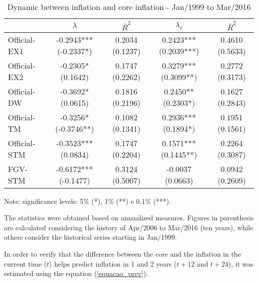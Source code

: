 \documentclass[10pt]{article}
\begin{document}
\begin{table}[h]
\centering
\caption{Dynamic between inflation and core inflation - Jan/1999 to Mar/2016}
\label{dinamica_nucleos}
\begin{threeparttable}
\begin{tabular}{@{}l|cc|cc@{}}
\toprule
             & \textbf{$\lambda$}     & \textbf{$\bar{R}^2$} & \textbf{$\lambda_c$}   & \textbf{$\bar{R}^2$} \\ \midrule
Official-EX1 & -0.2943*** (-0.2337*)  & 0.2034 (0.1237)      & 0.2423*** (0.2039***)  & 0.4610 (0.5633) \\
Official-EX2 & -0.2305*   (0.1642)    & 0.1747 (0.2262)      & 0.3279*** (0.3099**)   & 0.2772 (0.3173) \\
Official-DW  & -0.3692*   (0.0615)    & 0.1816 (0.2196)      & 0.2450**  (0.2303*)    & 0.1627 (0.2843) \\
Official-TM  & -0.3256*   (-0.3746**) & 0.1082 (0.1341)      & 0.2936*** (0.1894*)    & 0.1951 (0.1561) \\
Official-STM & -0.3523*** (0.0834)    & 0.1747 (0.2204)      & 0.1571*** (0.1445**)   & 0.2264 (0.3087) \\ 
FGV-STM      & -0.6172*** (-0.1477)   & 0.3124 (0.5007)      & -0.0037   (0.0663)     & 0.0942 (0.2609) \\ \bottomrule
\end{tabular}\begin{tablenotes}
\item \scriptsize{Note: significance levels: 5\% (*), 1\% (**) e 0.1\% (***).}
\item \scriptsize{The statistics were obtained based on annualized measures. Figures in parenthesis are calculated considering the history of Apr/2006 to Mar/2016 (ten years), while others consider the historical series starting in Jan/1999.}
\end{tablenotes}
\end{threeparttable}
\end{table}

In order to verify that the difference between the core and the inflation in the current time ($t$) helps predict inflation in 1 and 2 years ($t+12$ and $t+24$), it was estimated using the equation (\ref{equacao_prev}).

\end{document}
